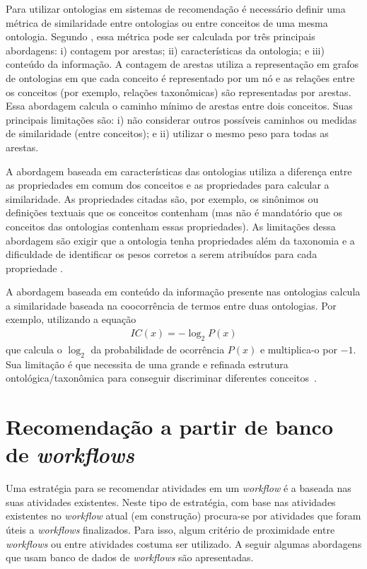 Para utilizar ontologias em sistemas de recomendação é necessário definir uma métrica de similaridade entre ontologias ou entre conceitos de uma mesma ontologia. Segundo , essa métrica pode ser calculada por três principais abordagens: i) contagem por arestas; ii) características da ontologia; e iii) conteúdo da informação. A contagem de arestas utiliza a representação em grafos de ontologias em que cada conceito é representado por um nó e as relações entre os conceitos (por exemplo, relações taxonômicas) são representadas por arestas. Essa abordagem calcula o caminho mínimo de arestas entre dois conceitos. Suas principais limitações são: i) não considerar outros possíveis caminhos ou medidas de similaridade (entre conceitos); e ii) utilizar o mesmo peso para todas as arestas.

A abordagem baseada em características das ontologias utiliza a diferença entre as propriedades em comum dos conceitos e as propriedades para calcular a similaridade. As propriedades citadas são, por exemplo, os sinônimos ou definições textuais que os conceitos contenham (mas não é mandatório que os conceitos das ontologias contenham essas propriedades). As limitações dessa abordagem são exigir que a ontologia tenha propriedades além da taxonomia e a dificuldade de identificar os pesos corretos a serem atribuídos para cada propriedade \cite{Sanchez2012}.

A abordagem baseada em conteúdo da informação presente nas ontologias calcula a similaridade baseada na coocorrência de termos entre duas ontologias. Por exemplo, utilizando a equação 
\begin{align}
IC(x) = - \log_2 P(x) 
\end{align}
que calcula o \(\log_2\) da probabilidade de ocorrência \(P(x)\) e multiplica-o por \(-1\). Sua limitação é que necessita de uma grande e refinada estrutura ontológica/taxonômica para conseguir discriminar diferentes conceitos~\cite{Sanchez2012}.

\section{Recomendação a partir de banco de \emph{workflows}}\label{SEC_RECOMENDACAO_BASE_WORKFLOWS}
Uma estratégia para se recomendar atividades em um \emph{workflow} é a baseada nas suas atividades existentes. Neste tipo de estratégia, com base nas atividades existentes no \emph{workflow} atual (em construção) procura-se por atividades que foram úteis a \emph{workflows} finalizados. Para isso, algum critério de proximidade entre \emph{workflows} ou entre atividades costuma ser utilizado. A seguir algumas abordagens que usam banco de dados de \emph{workflows} são apresentadas.

